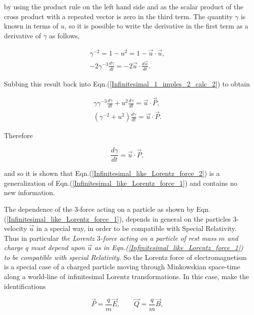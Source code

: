 \noindent by using the product rule on the left hand side and as the scalar product of the cross product with a repeated vector is zero in the third term. The quantity $\gamma$ is known in terms of $u$, so it is possible to write the derivative in the first term as a derivative of $\gamma$ as follows,

\begin{gather*} 
\gamma^{-2} = 1 - u^{2} = 1- \vec{u} \cdot \vec{u}, \\
-2 \gamma^{-3} \frac{d\gamma}{dt} = - 2 \vec{u} \cdot \frac{d \vec{u}}{dt}.
\end{gather*}

\noindent Subbing this result back into Eqn.(\ref{Infinitesimal_1_imples_2_calc_2}) to obtain

\begin{gather*} 
\gamma \gamma^{-3} \frac{d\gamma}{dt} + u^2 \frac{d\gamma}{dt} = \vec{u} \cdot \vec{P}, \\
(\gamma^{-2} + u^2) \frac{d\gamma}{dt} = \vec{u} \cdot \vec{P}.
\end{gather*} 

\noindent Therefore

\begin{equation*}
\frac{d\gamma}{dt} =  \vec{u} \cdot \vec{P},
\end{equation*}

\noindent and so it is shown that Eqn.(\ref{Infinitesimal_like_Lorentz_force_2}) is a generalization of Eqn.(\ref{Infinitesimal_like_Lorentz_force_1}) and contains no new information. 

The dependence of the $3$-force acting on a particle as shown by Eqn.(\ref{Infinitesimal_like_Lorentz_force_1}), depends in general on the particles $3$-velocity $\vec{u}$ in a special way, in order to be compatible with Special Relativity. Thus in particular \textit{the Lorentz $3$-force acting on a particle of rest mass $m$ and charge $q$ must depend upon $\vec{u}$ as in Eqn.(\ref{Infinitesimal_like_Lorentz_force_1}) to be compatible with special Relativity.} So the Lorentz force of electromagnetism is a special case of a charged particle moving through Minkowskian space-time along a world-line of infinitesimal Lorentz transformations. In this case, make the identifications

\begin{equation}\label{Infinitesimal_P_Q_interms_E_B} 
\vec{P} = \frac{q}{m} \vec{E}, \qquad \vec{Q} = \frac{q}{m}\vec{B},
\end{equation} 

